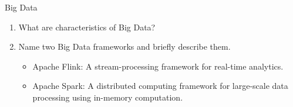 \documentclass{article}
\begin{document}
\begin{exercise}{Big Data}
  \begin{enumerate}
    \item What are characteristics of Big Data? 

    \item Name two Big Data frameworks and briefly describe them. \begin{solution}
      \begin{itemize}
        \item Apache Flink: A stream-processing framework for real-time analytics.
        \item Apache Spark: A distributed computing framework for large-scale data processing using in-memory computation.
      \end{itemize}
    \end{solution}
  \end{enumerate}
\end{exercise}
\end{document}
